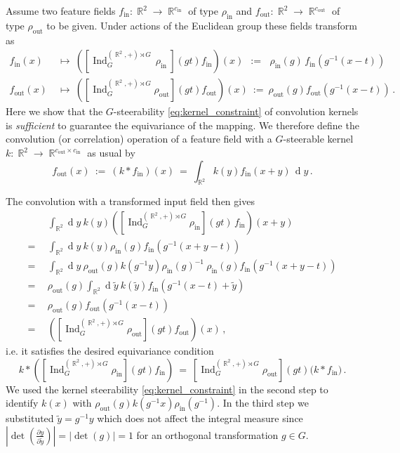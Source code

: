 \documentclass{article}
\DeclareMathOperator*{\R}{\mathbb{R}}
\begin{document}
Assume two feature fields $f_\text{in}:\R^2\to\R^{c_\text{in}}$ of type $\rho_\text{in}$ and $f_\text{out}:\R^2\to\R^{c_\text{out}}$ of type $\rho_\text{out}$ to be given.
Under actions of the Euclidean group these fields transform as
\begin{align*}
    f_\text{in}(x)
    \ &\mapsto\ 
    \left(\left[\operatorname{Ind}_{G}^{(\R^2,+)\rtimes G}\,\rho_\text{in}\ \right](gt)f_\text{in}\right)(x)
    \ \ :=\ 
    \ \, \rho_\text{in}(g)\,f_\text{in}\left(g^{-1}(x-t)\right)
    \\[3pt]
    f_\text{out}(x)
    \ &\mapsto\ 
    \left(\left[\operatorname{Ind}_{G}^{(\R^2,+)\rtimes G}\rho_\text{out}\right](gt)f_\text{out}\right)(x)
    \ :=\ 
    \rho_\text{out}(g)f_\text{out}\left(g^{-1}(x-t)\right) \,.
\end{align*}
Here we show that the $G$-steerability \eqref{eq:kernel_constraint} of convolution kernels is \emph{sufficient} to guarantee the equivariance of the mapping.
We therefore define the convolution (or correlation) operation of a feature field with a $G$-steerable kernel $k:\R^2\to\R^{c_\text{out}\times c_\text{in}}$ as usual by
\[
    f_\text{out}(x)
    \ :=\ \left(k\ast f_\text{in}\right)(x)
    \  =\ \int_{\R^2} k(y)f_\text{in}(x+y) \,\operatorname{d}\!y \,.
\]

The convolution with a transformed input field then gives
\begin{align*}
    &
    \int_{\R^2} \operatorname{d}\!y\ k(y)
    \left(\left[\operatorname{Ind}_{G}^{(\R^2,+)\rtimes G}\rho_\text{in}\right]\!(gt)\,f_\text{in}\right)(x+y) \\
    =\ \ &
    \int_{\R^2} \operatorname{d}\!y\ k(y)
    \rho_\text{in}(g)f_\text{in}\left(g^{-1}(x+y-t)\right) \\
    =\ \ &
    \int_{\R^2} \operatorname{d}\!y\ 
    \rho_\text{out}(g)k(g^{-1}y)\rho_\text{in}(g)^{-1}\ 
    \rho_\text{in}(g)f_\text{in}\left(g^{-1}(x+y-t)\right) \\
    =\ \ &
    \rho_\text{out}(g)
    \int_{\R^2} \operatorname{d}\!\tilde{y}\ k(\tilde{y})
    f_\text{in}\left(g^{-1}(x-t)+\tilde{y}\right) \\
    =\ \ &
    \rho_\text{out}(g) f_\text{out}\left(g^{-1}(x-t)\right) \\
    =\ \ &
    \left(\left[\operatorname{Ind}_{G}^{(\R^2,+)\rtimes G}\rho_\text{out}\right](gt)f_\text{out}\right)(x) \,,
\end{align*}
i.e. it satisfies the desired equivariance condition
\[
    k\ast \left(\left[\operatorname{Ind}_{G}^{(\R^2,+)\rtimes G}\rho_\text{in}\right]\!(gt) f_\text{in}\right)
    \ =\ \left[\operatorname{Ind}_{G}^{(\R^2,+)\rtimes G}\rho_\text{out}\right]\!(gt) \big(k\ast f_\text{in}\big) \,.
\]
We used the kernel steerability \eqref{eq:kernel_constraint} in the second step to identify $k(x)$ with $\rho_\text{out}(g)k(g^{-1}x)\rho_\text{in}(g^{-1})$.
In the third step we substituted $\tilde{y}=g^{-1}y$ which does not affect the integral measure since
$\left|\det\left(\frac{\partial y}{\partial\tilde{y}}\right)\right| = \left|\det(g)\right| = 1$
for an orthogonal transformation $g\in G$.
\end{document}
